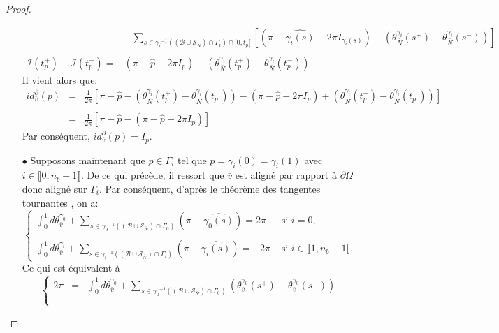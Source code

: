 \begin{proof}
\begin{itemize}
$$\begin{array}{ll}
            &-\displaystyle\sum_{s\in{\gamma_i}^{-1}((\mathcal{B}\cup\mathcal{S}_{\bar{N}})\cap\Gamma_i)\cap[0, t_p[}\left[\left(\pi-\widehat{\gamma_i(s)}-2\pi I_{\gamma_i(s)}\right)-\left(\theta^{\gamma_i}_{\bar{N}}(s^+) - \theta^{\gamma_i}_{\bar{N}}(s^-)\right)\right]\\\\
            \mathcal{I}(t_p^+)-\mathcal{I}(t_p^-)=&\left(\pi-\widehat{p}-2\pi I_p\right)-\left(\theta^{\gamma_i}_{\bar{N}}(t_p^+) - \theta^{\gamma_i}_{\bar{N}}(t_p^-)\right)
        \end{array}
        $$
        Il vient alors que:
        \begin{eqnarray*}
        id^\partial_{\bar{v}}(p)&=&\displaystyle\frac{1}{2\pi}\left[\pi-\widehat{p}-\left(\theta^{\gamma_i}_{\bar{N}}(t_p^+) - \theta^{\gamma_i}_{\bar{N}}(t_p^-)\right)-\left(\pi-\widehat{p}-2\pi I_p\right)+\left(\theta^{\gamma_i}_{\bar{N}}(t_p^+) - \theta^{\gamma_i}_{\bar{N}}(t_p^-)\right)\right]\\\\
        &=&\displaystyle\frac{1}{2\pi}\left[\pi-\widehat{p}-\left(\pi-\widehat{p}-2\pi I_p\right)\right]
        \end{eqnarray*}
        Par conséquent, $id^\partial_{\bar{v}}(p)=I_p$.\\
        \item[$\bullet$] Supposons maintenant que $p\in\Gamma_i$ tel que $p=\gamma_i(0)=\gamma_i(1)$ avec $i\in\llbracket0, n_b-1\rrbracket$. De ce qui précède, il ressort que $\bar{v}$ est aligné par rapport à $\partial\Omega$ donc aligné sur $\Gamma_i$. Par conséquent, d'après le théorème des tangentes tournantes \cite{hopf1935drehung, rotskoff2010gauss}, on a:
        $$
        \left\{
        \begin{array}{ll}
         \displaystyle\int_0^1 d\theta_{\bar{v}}^{\gamma_0}+\sum_{s\in{\gamma_0}^{-1}((\mathcal{B}\cup\mathcal{S}_{\bar{N}})\cap\Gamma_0)}\left(\pi-\widehat{\gamma_0(s)}\right)=2\pi&\mbox{ si }i=0,\\\\
        \displaystyle\int_0^1 d\theta_{\bar{v}}^{\gamma_i}+\sum_{s\in{\gamma_i}^{-1}((\mathcal{B}\cup\mathcal{S}_{\bar{N}})\cap\Gamma_i)}\left(\pi-\widehat{\gamma_i(s)}\right)=-2\pi&\mbox{ si }i\in\llbracket 1, n_b-1\rrbracket.
        \end{array}
        \right.
        $$
        Ce qui est équivalent à
        $$
        \left\{
        \begin{array}{lcl}
         2\pi&=&\displaystyle\int_0^1 d\theta_{\bar{v}}^{\gamma_0}+\displaystyle\sum_{s\in{\gamma_0}^{-1}((\mathcal{B}\cup\mathcal{S}_{\bar{N}})\cap\Gamma_0)}\left(\theta^{\gamma_0}_{\bar{v}}(s^+)-\theta^{\gamma_0}_{\bar{v}}(s^-)\right)\\\\

\end{array}$$
\end{itemize}
\end{proof}
